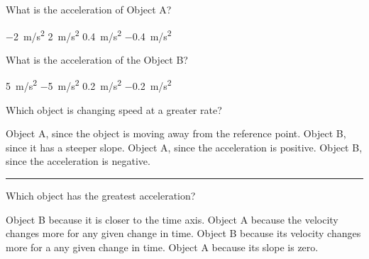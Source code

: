 \documentclass[]{exam}
\begin{document}
\begin{questions}
\question \label{c1CMp}
What is the acceleration of Object A?

\begin{randomizechoices}
    \choice \SI{-2}{m/s^2}
    \correctchoice \SI{2}{m/s^2}
    \choice \SI{0.4}{m/s^2}
    \choice \SI{-0.4}{m/s^2}
\end{randomizechoices}

\question 
What is the acceleration of the Object B?

\begin{randomizechoices}
    \choice \SI{5}{m/s^2}
    \correctchoice \SI{-5}{m/s^2}
    \choice \SI{0.2}{m/s^2}
    \choice \SI{-0.2}{m/s^2}
\end{randomizechoices}

\question \label{uwahd}
Which object is changing speed at a greater rate?

\begin{randomizechoices}
    \choice Object A, since the object is moving away from the reference point.
    \correctchoice Object B, since it has a steeper slope.
    \choice Object A, since the acceleration is positive.
    \choice Object B, since the acceleration is negative.
\end{randomizechoices}

\bigskip
\hrule

\question
Which object has the greatest acceleration?

\begin{center}
\end{center}

\begin{randomizechoices}
    \choice Object B because it is closer to the time axis.
    \correctchoice Object A because the velocity changes more for any given change in time.
    \choice Object B because its velocity changes more for a any given change in time.
    \choice Object A because its slope is zero.
\end{randomizechoices}


\end{questions}
\end{document}
